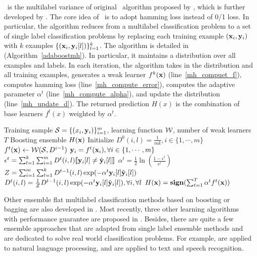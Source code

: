 {\adaboostmh\ is the multilabel variance of original \adaboost\ algorithm proposed by \citet{Schapire99improved}, which is further developed by \citet{Esuli2008boosting}.
The core idea of \adaboostmh\ is to adopt hamming loss instead of 0/1 loss. 
In particular, the algorithm reduces from a multilabel classification problem to a set of single label classification problems by replacing each training example $(\mathbf {x}_i,\mathbf {y}_i)$ with $k$ examples $\{(\mathbf {x}_i,\mathbf {y}_i[l])\}_{l=1}^k$.
The algorithm is detailed in (Algorithm~\ref{adaboostmh}).
In particular, it maintains a distribution over all examples and labels.
In each iteration, the algorithm takes in the distribution and all training examples, generates a weak learner $f^k(\mathbf {x})$ (line~\ref{mh_compuet_f}), computes hamming loss (line~\ref{mh_compute_error}), computes the adaptive parameter $\alpha^t$ (line~\ref{mh_compute_alpha}), and update the distribution (line~\ref{mh_update_d}).
The returned prediction $H(x)$ is the combination of base learners $f^t(x)$ weighted by $\alpha^t$.
\begin{algorithm}
\caption{\adaboostmh}
\label{adaboostmh}
\begin{algorithmic}[1]
	\REQUIRE Training sample $\mathcal{S} = \{(x_i,\mathbf {y}_i)\}_{i=1}^m$, learning function $\mathcal{W}$, number of weak learners $T$
	\ENSURE Boosting ensemble $H(\mathbf {x})$
	\STATE Initialize $D^0(i,l)=\frac{1}{mk},i\in\{1,\cdots,m\}$
		\STATE $f^t(\mathbf {x})\leftarrow\mathcal{W}(\mathcal{S},D^{i-1})$ \label{mh_compuet_f}
		\STATE $\mathbf {y}_i = f^t(\mathbf {x}_i),\forall i\in\{1,\cdots,m\}$
		\STATE $\epsilon^t =\sum_{l=1}^k\sum_{i=1}^{m}D^t(i,l){\llbracket \mathbf {y}_i[l]\neq\hat{\mathbf {y}}_i[l] \rrbracket}$ \label{mh_compute_error}
		\STATE $\alpha^{t} = \frac{1}{2}\ln\left(\frac{1-\epsilon^t}{\epsilon^t}\right)$ \label{mh_compute_alpha}
		\STATE $Z=\sum_{i=1}^{m}\sum_{l=1}^{k}D^{t-1}(i,l)\exp(-\alpha^t\mathbf {y}_i[l]\hat{\mathbf {y}}_i[l])$
		\STATE $D^t(i,l) = \frac{1}{Z}D^{t-1}(i,l)\exp(-\alpha^t\mathbf {y}_i[l]\hat{\mathbf {y}}_i[l]),\forall i,\forall l$ \label{mh_update_d}
	\ENDFOR
	\RETURN $H(\mathbf {x}) = \textbf{sign}(\sum_{t=1}^T\alpha^tf^t(\mathbf {x}))$
\end{algorithmic}
\end{algorithm}

Other ensemble flat multilabel classification methods based on boosting or bagging are also developed in \citep{Wang07simple,Yan07model,Kocev13tree}.
Most recently, three other learning algorithms with performance guarantee are proposed in \citep{Cortes14semble}.
Besides, there are quite a few ensemble approaches that are adapted from single label ensemble methods and are dedicated to solve real world classification problems.
For example, \citep{Collins05distrimnative,Zeman05improving,Sagae06parsing,Zhang09kbest} are applied to natural language processing, and \citep{Fiscus97a,Benesty08speech,Petrov10products}
are applied to text and speech recognition.


}
